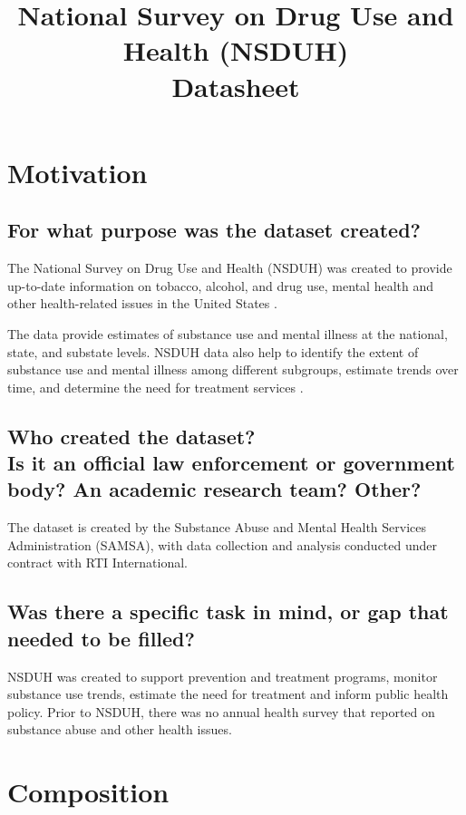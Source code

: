 \documentclass[letterpaper, 10 pt, conference]{ieeeconf}  %
\title{\LARGE \bf
National Survey on Drug Use and Health (NSDUH) \\{\color{blue}Datasheet}
}
\newcommand{\subtitle}[1]{{\\ \small \normalfont \color{purple} #1}}
\begin{document}
\maketitle
\thispagestyle{empty}
\pagestyle{empty}

\section{Motivation}

\subsection{For what purpose was the dataset created?}

The National Survey on Drug Use and Health (NSDUH) was created to provide up-to-date information on tobacco, alcohol, and drug use, mental health and other health-related issues in the United States \cite{nsduh}.

The data provide estimates of substance use and mental illness at the national, state, and substate levels. NSDUH data also help to identify the extent of substance use and mental illness among different subgroups, estimate trends over time, and determine the need for treatment services \cite{nsduh}.

\subsection{Who created the dataset? \subtitle{Is it an official law enforcement or government body? An academic research team? Other?}}

The dataset is created by the Substance Abuse and Mental Health Services Administration (SAMSA), with data collection and analysis conducted under contract with RTI International.

\subsection{Was there a specific task in mind, or gap that needed to be filled?}

NSDUH was created to support prevention and treatment programs, monitor substance use trends, estimate the need for treatment and inform public health policy. Prior to NSDUH, there was no annual health survey that reported on substance abuse and other health issues.

\section{Composition}
\end{document}
